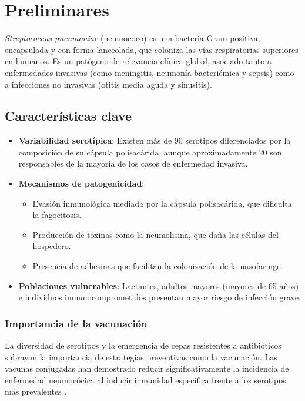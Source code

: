 \chapter{Preliminares}\label{chapter:marcoteorico}


\textit{Streptococcus pneumoniae} (neumococo) es una bacteria Gram-positiva, encapsulada y con forma lanceolada, que coloniza las vías respiratorias superiores en humanos. Es un patógeno de relevancia clínica global, asociado tanto a enfermedades invasivas (como meningitis, neumonía bacteriémica y sepsis) como a infecciones no invasivas (otitis media aguda y sinusitis).

\section{Características clave}
\begin{itemize}
    \item \textbf{Variabilidad serotípica}: Existen más de 90 serotipos diferenciados por la composición de su cápsula polisacárida, aunque aproximadamente 20 son responsables de la mayoría de los casos de enfermedad invasiva.
    \item \textbf{Mecanismos de patogenicidad}:
    \begin{itemize}
        \item Evasión inmunológica mediada por la cápsula polisacárida, que dificulta la fagocitosis.
        \item Producción de toxinas como la neumolisina, que daña las células del hospedero.
        \item Presencia de adhesinas que facilitan la colonización de la nasofaringe.
    \end{itemize}
    \item \textbf{Poblaciones vulnerables}: Lactantes, adultos mayores (mayores de 65 años) e individuos inmunocomprometidos presentan mayor riesgo de infección grave.
\end{itemize}

\subsection{Importancia de la vacunación}
La diversidad de serotipos y la emergencia de cepas resistentes a antibióticos subrayan la importancia de estrategias preventivas como la vacunación. Las vacunas conjugadas han demostrado reducir significativamente la incidencia de enfermedad neumocócica al inducir inmunidad específica frente a los serotipos más prevalentes \cite{Snedecor2020a,Snedecor2020b}.


